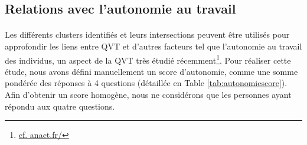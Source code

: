 \documentclass[11pt,fleqn,openany,frenchb]{book} %
\def\NOTE#1{\footnote{MS : #1}}
\begin{document}
\subsection{Relations avec l'autonomie au travail}
\paragraph{}
Les différents clusters identifiés et leurs intersections peuvent être utilisés pour approfondir les liens entre QVT et d'autres facteurs tel que l'autonomie au travail des individus, un aspect de la QVT très étudié récemment\footnote{\href{https://www.anact.fr/management-du-travail-la-methode-anact}{cf. anact.fr/}}.%
Pour réaliser cette étude, nous avons défini manuellement un score d'autonomie, comme une somme pondérée des réponses à 4 questions (détaillée en Table \ref{tab:autonomiescore}). Afin d'obtenir un score homogène, nous ne considérons que les personnes ayant répondu aux quatre questions. 
\end{document}
